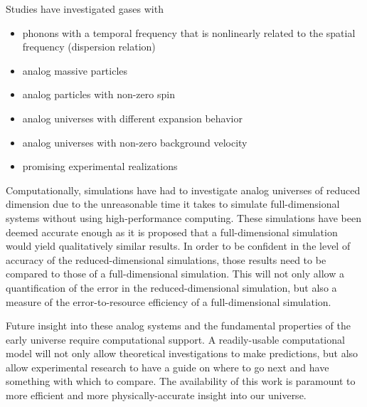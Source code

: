 \documentclass{article}
\begin{document}
    Studies have investigated gases with
    
    \begin{itemize}
        \item phonons with a temporal frequency that is nonlinearly related to the spatial frequency (dispersion relation)\cite{Nonlinear_dispersion_Lorentz_breaking_1, Nonlinear_dispersion_Lorentz_breaking_2, Nonlinear_dispersion_Lorentz_breaking_3}
        
        \item analog massive particles\cite{massive_1, massive_2, massive_3}

        \item analog particles with non-zero spin\cite{massive_and_spin_4, massive_and_spin_5, massive_and_spin_6, massive_and_spin_7}

        \item analog universes with different expansion behavior\cite{sudden_transition_1, sudden_transition_2, cyclic_cosmology, Experimental_interaction_strength_1}

        \item analog universes with non-zero background velocity\cite{background_velocity_1, background_velocity_2, background_velocity_3, background_velocity_4, background_velocity_5}

        \item promising experimental realizations \cite{Experimental_candidate_1, Experimental_candidate_2, Experimental_interaction_strength_1, Experimental_interaction_strength_2}
    \end{itemize}

    Computationally, simulations have had to investigate analog universes of reduced dimension due to the unreasonable time it takes to simulate full-dimensional systems without using high-performance computing.  These simulations have been deemed accurate enough as it is proposed that a full-dimensional simulation would yield qualitatively similar results.  In order to be confident in the level of accuracy of the reduced-dimensional simulations, those results need to be compared to those of a full-dimensional simulation.  This will not only allow a quantification of the error in the reduced-dimensional simulation, but also a measure of the error-to-resource efficiency of a full-dimensional simulation.

    Future insight into these analog systems and the fundamental properties of the early universe require computational support.  A readily-usable computational model will not only allow theoretical investigations to make predictions, but also allow experimental research to have a guide on where to go next and have something with which to compare.  The availability of this work is paramount to more efficient and more physically-accurate insight into our universe.
\end{document}
